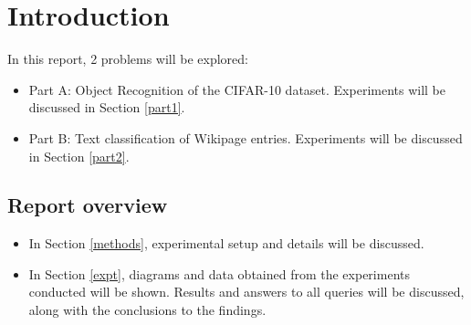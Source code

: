\chapter{Introduction}
In this report, 2 problems will be explored:
\begin{itemize}
    \item Part A: Object Recognition of the CIFAR-10 dataset. Experiments will be discussed in Section \ref{part1}.
    \item Part B: Text classification of Wikipage entries. Experiments will be discussed in Section \ref{part2}.
\end{itemize}

\section{Report overview}
\begin{itemize}
    \item In Section \ref{methods}, experimental setup and details will be discussed.
    \item In Section \ref{expt}, diagrams and data obtained from the experiments conducted will be shown. Results and answers to all queries will be discussed, along with the conclusions to the findings.
\end{itemize}
